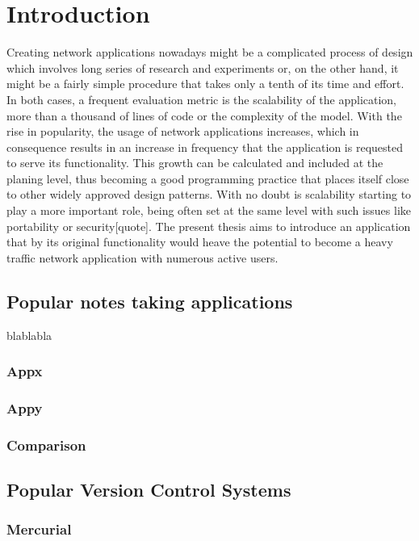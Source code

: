 \chapter{Introduction}
\label{sec:Introduction}
Creating network applications nowadays might be a complicated process of design which involves long series of research and experiments or, on the other hand, it might be a fairly simple procedure that takes only a tenth of its time and effort. In both cases, a frequent evaluation metric is the scalability of the application, more than a thousand of lines of code or the complexity of the model. With the rise in popularity, the usage of network applications increases, which in consequence results in an increase in frequency that the application is requested to serve its functionality. This growth can be calculated and included at the planing level, thus becoming a good programming practice that places itself close to other widely approved design patterns. With no doubt is scalability starting to play a more important role, being often set at the same level with such issues like portability or security[quote]. The present thesis aims to introduce an application that by its original functionality would heave the potential to become a heavy traffic network application with numerous active users.

\section{Popular notes taking applications}\label{sec:popular_apps} 
blablabla
\subsection{Appx}\label{subsec:x} 
\subsection{Appy}
\subsection{Comparison}
\section{Popular Version Control Systems}\label{sec:popular_vcs}

\subsection{Mercurial}\label{subsec:hg}

